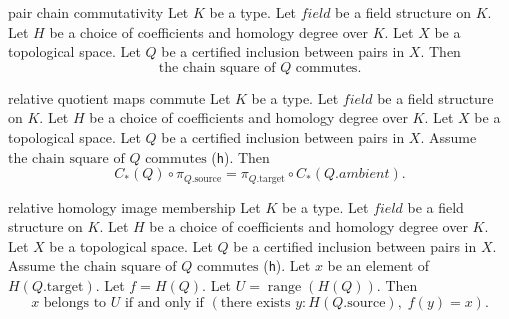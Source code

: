 \begin{cleanresult}{pair chain commutativity}
Let $K$ be a type.
Let $\mathit{field}$ be a field structure on $K$.
Let $H$ be a choice of coefficients and homology degree over $K$.
Let $X$ be a topological space.
Let $Q$ be a certified inclusion between pairs in $X$.
Then \[\text{the chain square of }Q\text{ commutes}.\]
\end{cleanresult}

\begin{cleanresult}{relative quotient maps commute}
Let $K$ be a type.
Let $\mathit{field}$ be a field structure on $K$.
Let $H$ be a choice of coefficients and homology degree over $K$.
Let $X$ be a topological space.
Let $Q$ be a certified inclusion between pairs in $X$.
Assume $\text{the chain square of }Q\text{ commutes}$ (\texttt{h}).
Then \[C_*(Q)\circ \pi_{Q.\mathrm{source}}=\pi_{Q.\mathrm{target}}\circ C_*(Q.ambient).\]
\par{}
\end{cleanresult}

\begin{cleanresult}{relative homology image membership}
Let $K$ be a type.
Let $\mathit{field}$ be a field structure on $K$.
Let $H$ be a choice of coefficients and homology degree over $K$.
Let $X$ be a topological space.
Let $Q$ be a certified inclusion between pairs in $X$.
Assume $\text{the chain square of }Q\text{ commutes}$ (\texttt{h}).
Let $x$ be an element of $H(Q.\mathrm{target})$.
Let $f = H(Q)$.
Let $U = \operatorname{range}(H(Q))$.
Then \[x\text{ belongs to }U\text{ if and only if }\left(\text{there exists }y : H(Q.\mathrm{source}),\; f(y)=x\right).\]
\par{}
\end{cleanresult}

